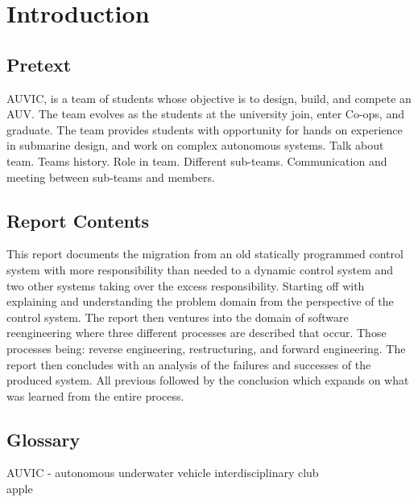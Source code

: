 
\chapter{Introduction} %

\label{Chapter1} %

\section{Pretext}

AUVIC, is a team of students whose objective is to design, build, and compete an AUV. The team evolves as the students at the university join, enter Co-ops, and graduate. The team provides students with opportunity for hands on experience in submarine design, and work on complex autonomous systems.
Talk about team. Teams history. Role in team. Different sub-teams. Communication and meeting between sub-teams and members.

\section{Report Contents}

This report documents the migration from an old statically programmed control system with more responsibility than needed to a dynamic control system and two other systems taking over the excess responsibility. Starting off with explaining and understanding the problem domain from the perspective of the control system. The report then ventures into the domain of software reengineering where three different processes are described that occur. Those processes being: reverse engineering, restructuring, and forward engineering. The report then concludes with an analysis of the failures and successes of the produced system. All previous followed by the conclusion which expands on what was learned from the entire process.

\section{Glossary}

AUVIC - autonomous underwater vehicle interdisciplinary club\\
\gls{apple}

